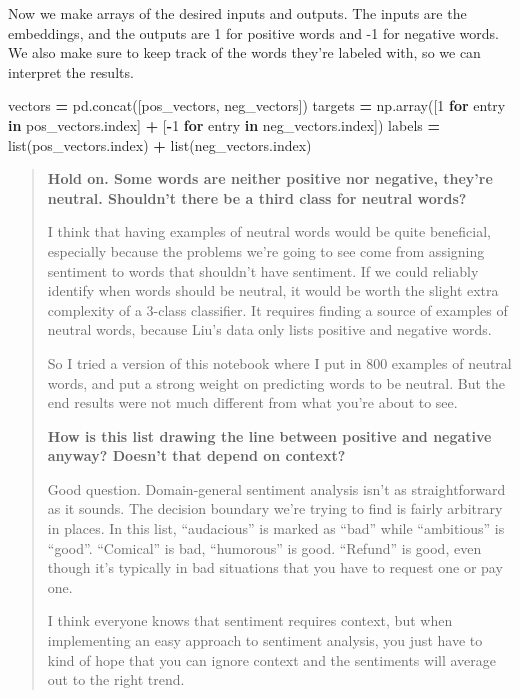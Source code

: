 \documentclass[]{book}
\newenvironment{Shaded}{\begin{snugshade}}{\end{snugshade}}
\newcommand{\KeywordTok}[1]{\textcolor[rgb]{0.13,0.29,0.53}{\textbf{#1}}}
\newcommand{\DecValTok}[1]{\textcolor[rgb]{0.00,0.00,0.81}{#1}}
\newcommand{\ControlFlowTok}[1]{\textcolor[rgb]{0.13,0.29,0.53}{\textbf{#1}}}
\newcommand{\OperatorTok}[1]{\textcolor[rgb]{0.81,0.36,0.00}{\textbf{#1}}}
\newcommand{\BuiltInTok}[1]{#1}
\newcommand{\NormalTok}[1]{#1}
\theoremstyle{definition}
\theoremstyle{definition}
\theoremstyle{definition}
\theoremstyle{remark}
\begin{document}
Now we make arrays of the desired inputs and outputs. The inputs are the
embeddings, and the outputs are 1 for positive words and -1 for negative
words. We also make sure to keep track of the words they're labeled
with, so we can interpret the results.

\begin{Shaded}
\begin{Highlighting}[]
\NormalTok{vectors }\OperatorTok{=}\NormalTok{ pd.concat([pos_vectors, neg_vectors])}
\NormalTok{targets }\OperatorTok{=}\NormalTok{ np.array([}\DecValTok{1} \ControlFlowTok{for}\NormalTok{ entry }\KeywordTok{in}\NormalTok{ pos_vectors.index] }\OperatorTok{+}\NormalTok{ [}\OperatorTok{-}\DecValTok{1} \ControlFlowTok{for}\NormalTok{ entry }\KeywordTok{in}\NormalTok{ neg_vectors.index])}
\NormalTok{labels }\OperatorTok{=} \BuiltInTok{list}\NormalTok{(pos_vectors.index) }\OperatorTok{+} \BuiltInTok{list}\NormalTok{(neg_vectors.index)}
\end{Highlighting}
\end{Shaded}

\begin{quote}
\textbf{Hold on. Some words are neither positive nor negative, they're
neutral. Shouldn't there be a third class for neutral words?}

I think that having examples of neutral words would be quite beneficial,
especially because the problems we're going to see come from assigning
sentiment to words that shouldn't have sentiment. If we could reliably
identify when words should be neutral, it would be worth the slight
extra complexity of a 3-class classifier. It requires finding a source
of examples of neutral words, because Liu's data only lists positive and
negative words.

So I tried a version of this notebook where I put in 800 examples of
neutral words, and put a strong weight on predicting words to be
neutral. But the end results were not much different from what you're
about to see.

\textbf{How is this list drawing the line between positive and negative
anyway? Doesn't that depend on context?}

Good question. Domain-general sentiment analysis isn't as
straightforward as it sounds. The decision boundary we're trying to find
is fairly arbitrary in places. In this list, ``audacious'' is marked as
``bad'' while ``ambitious'' is ``good''. ``Comical'' is bad,
``humorous'' is good. ``Refund'' is good, even though it's typically in
bad situations that you have to request one or pay one.

I think everyone knows that sentiment requires context, but when
implementing an easy approach to sentiment analysis, you just have to
kind of hope that you can ignore context and the sentiments will average
out to the right trend.
\end{quote}
\end{document}
